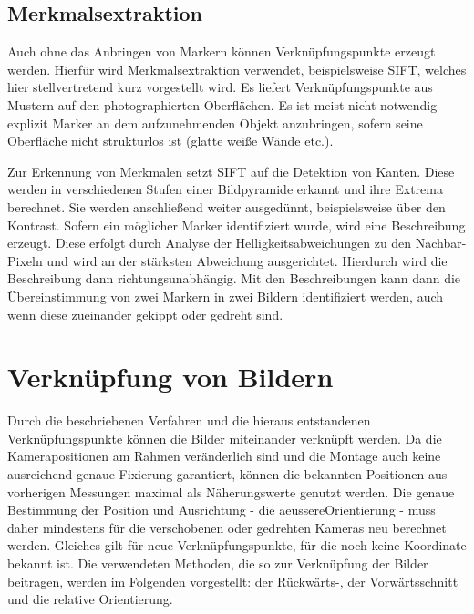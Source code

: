 \documentclass[./00PhotoBox.tex]{subfiles}
\begin{document}
\subsection{Merkmalsextraktion}
\label{ss:sift}
Auch ohne das Anbringen von Markern können Verknüpfungspunkte erzeugt werden. Hierfür wird Merkmalsextraktion verwendet, beispielsweise \Gls{SIFT}, welches hier stellvertretend kurz vorgestellt wird. Es liefert Verknüpfungspunkte aus Mustern auf den photographierten Oberflächen. Es ist meist nicht notwendig explizit Marker an dem aufzunehmenden Objekt anzubringen, sofern seine Oberfläche nicht strukturlos ist (glatte weiße Wände etc.).

Zur Erkennung von Merkmalen setzt \gls{SIFT} auf die Detektion von Kanten. Diese werden in verschiedenen Stufen einer Bildpyramide erkannt und ihre Extrema berechnet. Sie werden anschließend weiter ausgedünnt, beispielsweise über den Kontrast. Sofern ein möglicher Marker identifiziert wurde, wird eine Beschreibung erzeugt. Diese erfolgt  durch Analyse der Helligkeitsabweichungen zu den Nachbar-Pixeln und wird an der stärksten Abweichung ausgerichtet. Hierdurch wird die Beschreibung dann richtungsunabhängig. Mit den Beschreibungen kann dann die Übereinstimmung von zwei Markern in zwei Bildern identifiziert werden, auch wenn diese zueinander gekippt oder gedreht sind.
\citep[vgl.][S. 484f]{luhmann}

\section{Verknüpfung von Bildern}
\label{s:photogramm}
Durch die beschriebenen Verfahren und die hieraus entstandenen Verknüpfungs\-punkte können die Bilder miteinander verknüpft werden. Da die Kamerapositionen am Rahmen veränderlich sind und die Montage auch keine ausreichend genaue Fixierung garantiert, können die bekannten Positionen aus vorherigen Messungen maximal als Näherungswerte genutzt werden. Die genaue Bestimmung der Position und Ausrichtung - die \gls{aeussereOrientierung} - muss daher mindestens für die verschobenen oder gedrehten Kameras neu berechnet werden. Gleiches gilt für neue Verknüpfungspunkte, für die noch keine Koordinate bekannt ist. Die verwendeten Methoden, die so zur Verknüpfung der Bilder beitragen, werden im Folgenden vorgestellt: der Rückwärts-, der Vorwärtsschnitt und die relative Orientierung.
\end{document}
